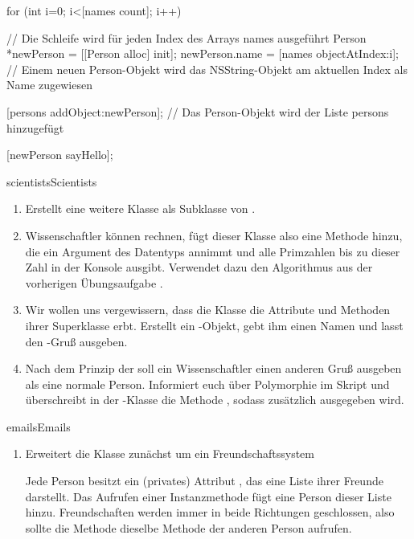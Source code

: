 \documentclass[parskip=half, final]{scrreprt}
\begin{document}
\begin{lecture}
\begin{enumerate}
\begin{objclst}
for (int i=0; i<[names count]; i++) { // Die Schleife wird für jeden Index des Arrays names ausgeführt
    Person *newPerson = [[Person alloc] init];
    newPerson.name = [names objectAtIndex:i]; // Einem neuen Person-Objekt wird das NSString-Objekt am aktuellen Index als Name zugewiesen

    [persons addObject:newPerson]; // Das Person-Objekt wird der Liste persons hinzugefügt

    [newPerson sayHello];
}
\end{objclst}


\end{enumerate}

\begin{exc}

\begin{excitem}{scientists}{Scientists}

\begin{enumerate}
\item Erstellt eine weitere Klasse  als Subklasse von .
\item Wissenschaftler können rechnen, fügt dieser Klasse also eine Methode  hinzu, die ein Argument des Datentyps  annimmt und alle Primzahlen bis zu dieser Zahl in der Konsole ausgibt. Verwendet dazu den Algorithmus aus der vorherigen Übungsaufgabe .
\item Wir wollen uns vergewissern, dass die Klasse  die Attribute und Methoden ihrer Superklasse  erbt. Erstellt ein -Objekt, gebt ihm einen Namen und lasst den -Gruß ausgeben.
\item Nach dem Prinzip der  soll ein Wissenschaftler einen anderen Gruß ausgeben als eine normale Person. Informiert euch über Polymorphie im Skript und überschreibt in der -Klasse die Methode , sodass zusätzlich  ausgegeben wird.
\end{enumerate}

\end{excitem}

\begin{excitem}{emails}{Emails}

\begin{enumerate}
\item Erweitert die Klasse  zunächst um ein Freundschaftssystem

Jede Person besitzt ein (privates) Attribut , das eine Liste ihrer Freunde darstellt. Das Aufrufen einer Instanzmethode  fügt eine Person dieser Liste hinzu. Freundschaften werden immer in beide Richtungen geschlossen, also sollte die Methode  dieselbe Methode der anderen Person aufrufen.


\end{enumerate}
\end{excitem}
\end{exc}
\end{lecture}
\end{document}
